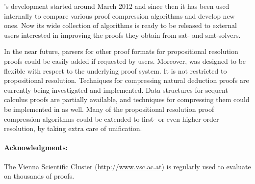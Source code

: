 \documentclass{llncs}
\begin{document}
{\skeptik}'s development started around March 2012 and since then it has been used internally to compare various proof compression algorithms and develop new ones. Now its wide collection of algorithms is ready to be released to external users interested in improving the proofs they obtain from sat- and smt-solvers. 

In the near future, parsers for other proof formats for propositional resolution proofs could be easily added if requested by users. Moreover, {\skeptik} was designed to be flexible with respect to the underlying proof system. It is not restricted to propositional resolution. Techniques for compressing natural deduction proofs are currently being investigated and implemented. 
Data structures for sequent calculus proofs are partially available, and techniques for compressing them 
could be implemented in {\skeptik} as well. Many of the propositional resolution proof compression algorithms could be extended to first- or even higher-order resolution, by taking extra care of unification. 

\vspace{-5pt}

\paragraph{Acknowledgments: } The Vienna Scientific Cluster (\url{http://www.vsc.ac.at}) is regularly used to evaluate {\skeptik} on thousands of proofs.




\end{document}
